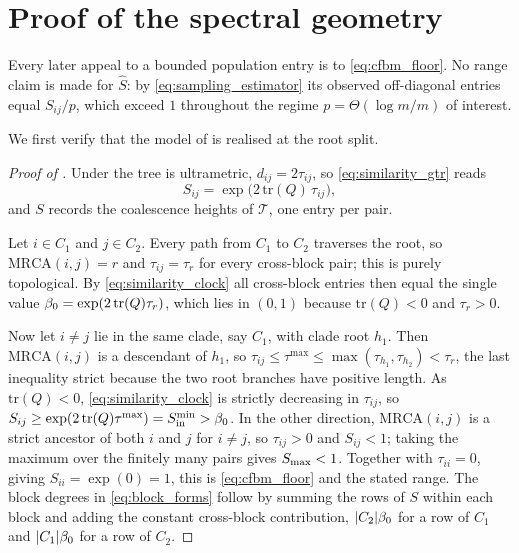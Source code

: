 \section{Proof of the spectral geometry}\label{app:comp1}

\noindent Every later appeal to a bounded population entry is to \eqref{eq:cfbm_floor}.
No range claim is made for $\hat S$: by \eqref{eq:sampling_estimator} its observed
off-diagonal entries equal $S_{ij}/p$, which exceed $1$ throughout the regime
$p=\Theta(\log m/m)$ of interest.

\noindent We first verify that the model of  is realised at the root split.

\begin{proof}[Proof of ]
Under  the tree is ultrametric, $d_{ij}=2\tau_{ij}$, so \eqref{eq:similarity_gtr}
reads
\begin{equation}\label{eq:similarity_clock}
   S_{ij}=\exp\bigl(2\,\mathrm{tr}(Q)\,\tau_{ij}\bigr),
\end{equation}
and $S$ records the coalescence heights of $\mathcal{T}$, one entry per pair.

Let $i \in C_1$ and $j \in C_2$. Every path from $C_1$ to $C_2$ traverses the root, so
$\mathrm{MRCA}(i,j) = r$ and $\tau_{ij} = \tau_r$ for every cross-block pair; this is purely
topological. By \eqref{eq:similarity_clock} all cross-block entries then equal the single value
$\beta_0 = \exp(2\,\mathrm{tr}(Q)\tau_r)$, which lies in $(0,1)$ because $\mathrm{tr}(Q)<0$ and
$\tau_r>0$.

Now let $i \ne j$ lie in the same clade, say $C_1$, with clade root $h_1$. Then $\mathrm{MRCA}(i,j)$ is
a descendant of $h_1$, so $\tau_{ij} \le \tau^{\max} \le \max(\tau_{h_1},\tau_{h_2}) < \tau_r$, the
last inequality strict because the two root branches have positive length. As $\mathrm{tr}(Q)<0$,
\eqref{eq:similarity_clock} is strictly decreasing in $\tau_{ij}$, so
$S_{ij} \ge \exp(2\,\mathrm{tr}(Q)\tau^{\max}) = S_{\mathrm{in}}^{\min} > \beta_0$. In the other direction,
$\mathrm{MRCA}(i,j)$ is a strict ancestor of both $i$ and $j$ for $i \ne j$, so $\tau_{ij}>0$ and
$S_{ij}<1$; taking the maximum over the finitely many pairs gives $S_{\max}<1$. Together with
$\tau_{ii}=0$, giving $S_{ii}=\exp(0)=1$, this is \eqref{eq:cfbm_floor} and the stated range. The block degrees in
\eqref{eq:block_forms} follow by summing the rows of $S$ within each block and adding the constant
cross-block contribution, $|C_2|\beta_0$ for a row of $C_1$ and $|C_1|\beta_0$ for a row of $C_2$.
\end{proof}

